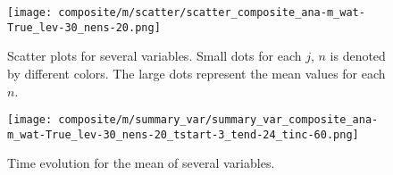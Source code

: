 \documentclass[a4paper, 12pt]{article}
\begin{document}

\begin{figure}[ht]
\noindent \centering
\texttt{[image: composite/m/scatter/scatter\_composite\_ana-m\_wat-True\_lev-30\_nens-20.png]}\\
\caption{Scatter plots for several variables. Small dots for each $j$, $n$ is denoted by different colors. The large dots represent the mean values for each $n$.} \label{fig:comp_scatter}
\end{figure}


\begin{figure}[ht]
\noindent \centering
\texttt{[image: composite/m/summary\_var/summary\_var\_composite\_ana-m\_wat-True\_lev-30\_nens-20\_tstart-3\_tend-24\_tinc-60.png]}\\
\caption{Time evolution for the mean of several variables.} \label{fig:comp_summary_var}
\end{figure}
\end{document}
